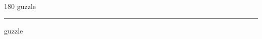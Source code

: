 
\begin{frame}
\begin{center}
\begin{turn}{180}
{\fontsize{2.5cm}{1em}\selectfont guzzle}
\end{turn}
\vspace{1em}\par  
\hrule
\vspace{1em}\par  
{\fontsize{2.5cm}{1em}\selectfont guzzle}
\end{center}
\end{frame}
